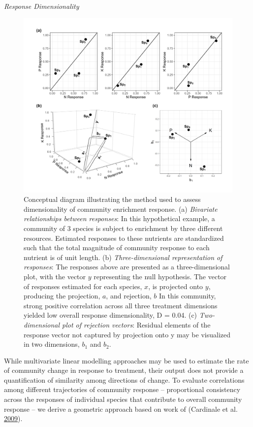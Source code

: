 \documentclass[twoside,12pt,final]{ucthesis-CA2012}
\begin{document}
\begin{ucmainmatter}
\emph{Response Dimensionality}
\begin{figure}
\centering
\includegraphics[width=\textwidth,height=0.6\textheight]{figure/Fig1_1.png}
\caption{Conceptual diagram illustrating the method used to assess dimensionality of community enrichment response. \newline (a) \emph{Bivariate relationships between responses}: In this hypothetical example, a community of 3 species is subject to enrichment by three different resources. Estimated responses to these nutrients are standardized such that the total magnitude of community response to each nutrient is of unit length. \newline (b) \emph{Three-dimensional representation of responses}: The responses above are presented as a three-dimensional plot, with the vector \(y\) representing the null hypothesis. The vector of responses estimated for each species, \(x\), is projected onto \(y\), producing the projection, \(a\), and rejection, \(b\) In this community, strong positive correlation across all three treatment dimensions yielded low overall response dimensionality, D = 0.04. \newline (c) \emph{Two-dimensional plot of rejection vectors}: Residual elements of the response vector not captured by projection onto y may be visualized in two dimensions, \(b_1\) and \(b_2\). \label{fig-1-1}}
\end{figure}
While multivariate linear modelling approaches may be used to estimate the rate of community change in response to treatment, their output does not provide a quantification of similarity among directions of change. To evaluate correlations among different trajectories of community response -- proportional consistency across the responses of individual species that contribute to overall community response -- we derive a geometric approach based on work of (Cardinale et al. \protect\hyperlink{ref-Cardinale2009}{2009}).


\end{ucmainmatter}
\end{document}
